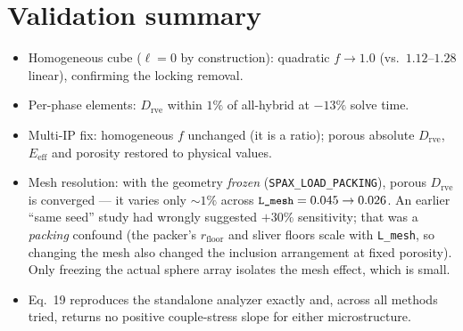 \documentclass[11pt]{article}
\newcommand{\code}[1]{\texttt{\small #1}}
\newcommand{\env}[1]{\texttt{\small #1}}
\begin{document}
\section{Validation summary}
\begin{itemize}[nosep]
  \item Homogeneous cube ($\ell\!=\!0$ by construction): quadratic $f\!\to\!1.0$
        (vs.\ $1.12$--$1.28$ linear), confirming the locking removal.
  \item Per-phase elements: $D_\text{rve}$ within $1\%$ of all-hybrid at
        $-13\%$ solve time.
  \item Multi-IP fix: homogeneous $f$ unchanged (it is a ratio); porous absolute
        $D_\text{rve}$, $E_\text{eff}$ and porosity restored to physical values.
  \item Mesh resolution: with the geometry \emph{frozen}
        (\env{SPAX\_LOAD\_PACKING}), porous $D_\text{rve}$ is converged --- it
        varies only $\sim\!1\%$ across $\code{L\_mesh}=0.045\to0.026$. An earlier
        ``same seed'' study had wrongly suggested $+30\%$ sensitivity; that was a
        \emph{packing} confound (the packer's $r_\text{floor}$ and sliver floors
        scale with \code{L\_mesh}, so changing the mesh also changed the
        inclusion arrangement at fixed porosity). Only freezing the actual sphere
        array isolates the mesh effect, which is small.
  \item Eq.~19 reproduces the standalone analyzer exactly and, across all
        methods tried, returns no positive couple-stress slope for either
        microstructure.
\end{itemize}
\end{document}
